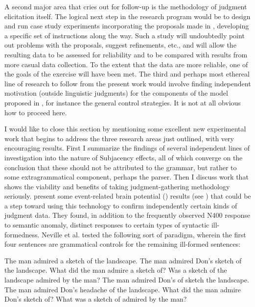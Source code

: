  A second  major area that cries out for follow-up is the methodology of judgment elicitation itself. The logical next step in the research program would be to design and run case study experiments incorporating the proposals made in , developing a specific set of instructions along the way. Such a study will undoubtedly point out problems with the proposals, suggest refinements, etc., and will allow the resulting data to be assessed for reliability and to be compared with results from more casual data collection. To the extent that the data are more reliable, one of the goals of the exercise will have been met. The third and perhaps most ethereal line of research to follow from the present work would involve finding independent motivation  (outside linguistic judgments) for the components of the model proposed in , for instance the general control strategies. It is not at all obvious how to proceed here.



 I would like to close this section by mentioning some excellent new experimental work that begins to address the three research areas just outlined, with very encouraging results. First I summarize the findings of several independent lines of investigation into the nature of Subjacency effects, all of which converge on the conclusion that these should not be attributed to the grammar, but rather to some extragrammatical component, perhaps the parser. Then I discuss work that shows the viability and benefits of taking judgment-gathering methodology seriously. \citet{NevilleEtAl1991} present some event-related brain potential () results (see ) that could be a step toward using this technology to confirm independently certain kinds of judgment data. They found, in addition to the frequently observed N400 response to semantic anomaly, distinct responses to certain types of syntactic ill-formedness. Neville et al. tested the following sort of paradigm, wherein the first four sentences are grammatical controls for the remaining ill-formed sentences:

 \ea\label{ex:6:1}
 \ea
 The man admired a sketch of the landscape.
 \ex
 The man admired Don's sketch of the landscape.
 \ex
 What did the man admire a sketch of?
 \ex
 Was a sketch of the landscape admired by the man? 
 \ex
 The man admired Don's of sketch the landscape.
 \ex
 The man admired Don's headache of the landscape.
 \ex
 What did the man admire Don's sketch of?
 \ex
 What was a sketch of admired by the man?
 \z
 \z

